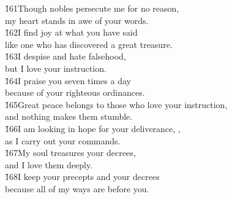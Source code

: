 \begin{poetry}
\poeml \v{161}Though nobles persecute me for no reason, \\
\poemll    my heart stands in awe of your words. \\
\poeml \v{162}I find joy at what you have said \\
\poemll    like one who has discovered a great treasure. \\
\poeml \v{163}I despise and hate falsehood, \\
\poemll    but I love your instruction. \\
\poeml \v{164}I praise you seven times a day \\
\poemll    because of your righteous ordinances. \\
\poeml \v{165}Great peace belongs to those who love your instruction, \\
\poemll    and nothing makes them stumble. \\
\poeml \v{166}I am looking in hope for your deliverance, , \\
\poemll    as I carry out your commands. \\
\poeml \v{167}My soul treasures your decrees, \\
\poemll    and I love them deeply. \\
\poeml \v{168}I keep your precepts and your decrees \\
\poemll    because all of my ways are before you.
\end{poetry}

